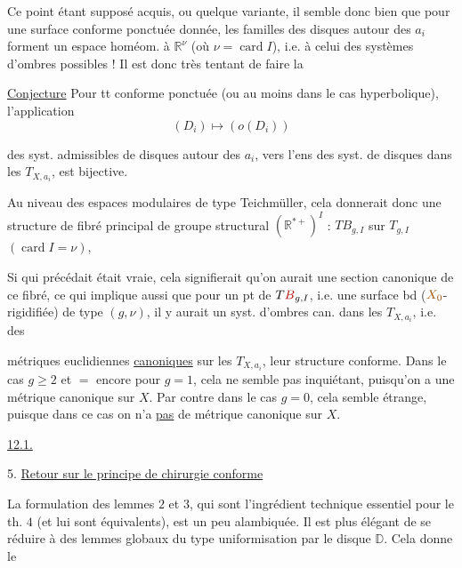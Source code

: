 Ce point étant supposé acquis, ou quelque
variante, il semble donc bien que
pour une surface conforme ponctuée
donnée,  les familles  des disques autour
des $a_i$ forment un espace homéom.
à $\mathbb R^\nu$ (où $\nu=\operatorname{card} I$), i.e. à celui
des systèmes d'ombres possibles ! Il
est donc très tentant de faire la

\uline{Conjecture} Pour tt  conforme
ponctuée (ou  au moins dans le cas
hyperbolique), l'application 
\[
(D_i)\longmapsto(o(D_i))
\]

des syst. admissibles de disques  autour
des $a_i$, vers l'ens des syst.
de disques  dans les $T_{X,a_i}$,
est bijective. 

Au niveau des espaces
modulaires de type Teichmüller,
cela donnerait donc une  structure
de fibré principal de groupe
structural $(\mathbb R^{*+})^I$ : $TB_{g,I}$
sur $T_{g,I}$ $(\operatorname{card}I=\nu)$, \deleted{\unsure{--}}

Si  qui précédait
 était vraie, cela signifierait
qu'on aurait une section canonique
de ce fibré, ce qui implique
aussi que pour un pt de $T\deleted{B}_{g,I}$,
i.e. une surface bd  ($\unsure{X_0}$-rigidifiée)
de type $(g,\nu)$, il y aurait un syst.
d'ombres can. dans les $T_{X,a_i}$, i.e. des

métriques euclidiennes \uline{canoniques} sur
les $T_{X,a_i}$,  leur structure
conforme. Dans le cas $g\geq2$ et $=$
encore pour $g=1$, cela ne semble pas
inquiétant, puisqu'on a une
métrique canonique sur $X$. Par
contre dans le cas $g=0$, cela semble
étrange, puisque dans ce cas on n'a
\uline{pas} de métrique canonique sur $X$.

\uline{12.1.}

5. \uline{Retour sur le principe de chirurgie conforme}

La formulation des lemmes  $2$ et $3$, qui
sont l'ingrédient technique essentiel pour le
th. $4$ (et lui sont équivalents), est un peu
alambiquée. Il est plus élégant de se
réduire à des lemmes globaux du type
uniformisation par le disque $\mathbb D$. Cela
donne le


